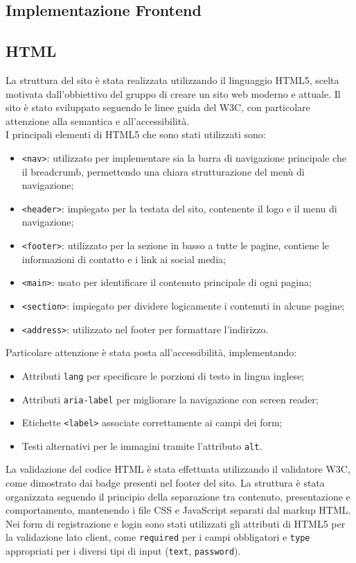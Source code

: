 \documentclass[a4paper, 12pt]{article}
\begin{document}
\begin{justify}
\section{Implementazione Frontend}

\subsection{HTML}

La struttura del sito è stata realizzata utilizzando il linguaggio HTML5, scelta motivata dall'obbiettivo del gruppo di creare un sito web moderno e attuale. Il sito è stato sviluppato seguendo le linee guida del W3C, con particolare attenzione alla semantica e all'accessibilità.\\
I principali elementi di HTML5 che sono stati utilizzati sono:
\begin{itemize}
    \item \texttt{<nav>}: utilizzato per implementare sia la barra di navigazione principale che il breadcrumb, permettendo una chiara strutturazione del menù di navigazione;
    \item \texttt{<header>}: impiegato per la testata del sito, contenente il logo e il menu di navigazione;
    \item \texttt{<footer>}: utilizzato per la sezione in basso a tutte le pagine, contiene le informazioni di contatto e i link ai social media;
    \item \texttt{<main>}: usato per identificare il contenuto principale di ogni pagina;
    \item \texttt{<section>}: impiegato per dividere logicamente i contenuti in alcune pagine;
    \item \texttt{<address>}: utilizzato nel footer per formattare l'indirizzo.
\end{itemize}
Particolare attenzione è stata posta all'accessibilità, implementando:
\begin{itemize}
    \item Attributi \texttt{lang} per specificare le porzioni di testo in lingua inglese;
    \item Attributi \texttt{aria-label} per migliorare la navigazione con screen reader;
    \item Etichette \texttt{<label>} associate correttamente ai campi dei form;
    \item Testi alternativi per le immagini tramite l'attributo \texttt{alt}.
\end{itemize}
La validazione del codice HTML è stata effettuata utilizzando il validatore W3C, come dimostrato dai badge presenti nel footer del sito. La struttura è stata organizzata seguendo il principio della separazione tra contenuto, presentazione e comportamento, mantenendo i file CSS e JavaScript separati dal markup HTML.\\
Nei form di registrazione e login sono stati utilizzati gli attributi di HTML5 per la validazione lato client, come \texttt{required} per i campi obbligatori e \texttt{type} appropriati per i diversi tipi di input (\texttt{text}, \texttt{password}).


\end{justify}
\end{document}
